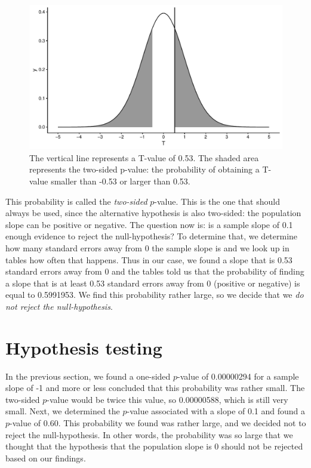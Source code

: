 \documentclass[]{book}\usepackage[]{graphicx}\usepackage[]{color}
\makeatletter
\def\maxwidth{ %
  \ifdim\Gin@nat@width>\linewidth
    \linewidth
  \else
    \Gin@nat@width
  \fi
}
\newenvironment{knitrout}{}{} %
\makeatother
\begin{document}
\begin{knitrout}
\color{fgcolor}\begin{figure}

{\centering \includegraphics[width=\maxwidth]{figure/inf_19-1} 

}

\caption[The vertical line represents a T-value of 0.53]{The vertical line represents a T-value of 0.53. The shaded area represents the two-sided p-value: the probability of obtaining a T-value smaller than -0.53 or larger than 0.53.}\label{fig:inf_19}
\end{figure}


\end{knitrout}

This probability is called the \textit{two-sided} $p$-value. This is the one that should always be used, since the alternative hypothesis is also two-sided: the population slope can be positive or negative. The question now is: is a sample slope of 0.1 enough evidence to reject the null-hypothesis? To determine that, we determine how many standard errors away from 0 the sample slope is and we look up in tables how often that happens. Thus in our case, we found a slope that is 0.53 standard errors away from 0 and the tables told us that the probability of finding a slope that is at least 0.53 standard errors away from 0 (positive or negative) is equal to 0.5991953. We find this probability rather large, so we decide that we \textit{do not reject the null-hypothesis}.


\section{Hypothesis testing}

In the previous section, we found a one-sided $p$-value of 0.00000294 for a sample slope of -1 and more or less concluded that this probability was rather small. The two-sided $p$-value would be twice this value, so 0.00000588, which is still very small. Next, we determined the $p$-value associated with a slope of 0.1 and found a $p$-value of 0.60. This probability we found was rather large, and we decided not to reject the null-hypothesis. In other words, the probability was so large that we thought that the hypothesis that the population slope is 0 should not be rejected based on our findings.
\end{document}

